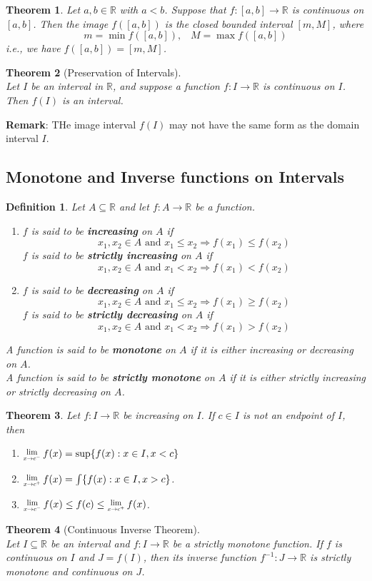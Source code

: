 \documentclass[8pt]{article}
\newcommand{\Lim}[1]{\raisebox{0.5ex}{\scalebox{0.8}{$\displaystyle \lim_{#1}\;$}}}
\newtheorem{definition}{Definition}[section]
\newtheorem{theorem}{Theorem}[section]
\theoremstyle{definition}
\begin{document}
\begin{theorem}\normalfont Let $a,b\in\mathbb{R}$ with $a<b$. Suppose that $f:[a,b]\to\mathbb{R}$ is continuous on $[a,b]$. Then the image $f([a,b])$ is the closed bounded interval $[m,M]$, where
\[
m=\min f([a,b]),\;\;\; M=\max f([a,b])
\]
i.e., we have $f([a,b])=[m,M]$.
\end{theorem}
\begin{theorem}[Preservation of Intervals]
\hfill\\\normalfont Let $I$ be an interval in $\mathbb{R}$, and suppose a function $f:I\to\mathbb{R}$ is continuous on $I$. Then $f(I)$ is an interval.
\end{theorem}
\textbf{Remark}: THe image interval $f(I)$ may not have the same form as the domain interval $I$.
\subsection{Monotone and Inverse functions on Intervals}
\begin{definition}\normalfont Let $A\subseteq\mathbb{R}$ and let $f:A\to\mathbb{R}$ be a function.
\begin{enumerate}
\item $f$ is said to be \textbf{increasing} on $A$ if
\[
x_1,x_2\in A\text{ and }x_1\leq x_2\Rightarrow f(x_1)\leq f(x_2)
\]
$f$ is said to be \textbf{strictly increasing} on $A$ if
\[
x_1,x_2\in A\text{ and }x_1< x_2\Rightarrow f(x_1)< f(x_2)
\]
\item $f$ is said to be \textbf{decreasing} on $A$ if
\[
x_1,x_2\in A\text{ and }x_1\leq x_2\Rightarrow f(x_1)\geq f(x_2)
\]
$f$ is said to be \textbf{strictly decreasing} on $A$ if
\[
x_1,x_2\in A\text{ and }x_1< x_2\Rightarrow f(x_1)> f(x_2)
\]
\end{enumerate}
\item A function is said to be \textbf{monotone} on $A$ if it is either increasing or decreasing on $A$.\\A function is said to be \textbf{strictly monotone} on $A$ if it is either strictly increasing or strictly decreasing on $A$.
\end{definition}
\begin{theorem}
\normalfont Let $f:I\to\mathbb{R}$ be increasing on $I$. If $c\in I$ is not an endpoint of $I$, then
\begin{enumerate}
\item $\Lim{x\to c^-}f(x)=\sup\{f(x):x\in I, x<c\}$
\item $\Lim{x\to c^+}f(x)=\int\{f(x):x\in I, x>c\}$.
\item $\Lim{x\to c^-}f(x)\leq f(c)\leq \Lim{x\to c^+}f(x)$.
\end{enumerate}
\end{theorem}
\begin{theorem}[Continuous Inverse Theorem]
\hfill\\\normalfont Let $I\subseteq \mathbb{R}$ be an interval and $f:I\to\mathbb{R}$ be a strictly monotone function. If $f$ is continuous on $I$ and $J=f(I)$, then its inverse function $f^{-1}:J\to \mathbb{R}$ is strictly monotone and continuous on $J$.
\end{theorem}
\end{document}
